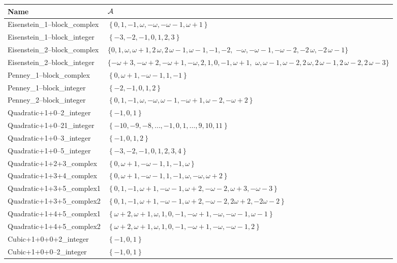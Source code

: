 \begin{tabular}{lp{}}  Name & $\mathcal{A}$\\ \hline
Eisenstein\_1--block\_complex &
$ \left\{0, 1, -1, \omega, -\omega, -\omega - 1, \omega + 1\right\}  $ \\
Eisenstein\_1--block\_integer &
$ \left\{-3, -2, -1, 0, 1, 2, 3\right\}  $ \\
Eisenstein\_2--block\_complex &
$ \{0, 1, \omega, \omega + 1, 2 \, \omega, 2 \, \omega - 1, \omega - 1, -1, -2,$ \newline $-\omega, -\omega - 1, -\omega - 2, -2 \, \omega, -2 \, \omega - 1 \}  $ \\
Eisenstein\_2--block\_integer &
$ \{-\omega + 3, -\omega + 2, -\omega + 1, -\omega, 2, 1, 0, -1, \omega + 1,$ \newline $ \omega, \omega - 1, \omega - 2, 2 \, \omega, 2 \, \omega - 1, 2 \, \omega - 2, 2 \, \omega - 3\}  $ \\
Penney\_1--block\_complex &
$ \left\{0, \omega + 1, -\omega - 1, 1, -1\right\}  $ \\
Penney\_1--block\_integer &
$ \left\{-2, -1, 0, 1, 2\right\}  $ \\
Penney\_2--block\_integer &
$ \left\{0, 1, -1, \omega, -\omega, \omega - 1, -\omega + 1, \omega - 2, -\omega + 2\right\}  $ \\
Quadratic+1+0--2\_integer &
$ \left\{-1, 0, 1\right\}  $ \\
Quadratic+1+0--21\_integer &
$ \left\{-10, -9, -8, \dots, -1, 0, 1, \dots, 9, 10, 11\right\}  $ \\
Quadratic+1+0--3\_integer &
$ \left\{-1,0, 1,  2\right\}  $ \\
Quadratic+1+0--5\_integer &
$ \left\{-3, -2, -1, 0, 1, 2, 3, 4\right\}  $ \\
Quadratic+1+2+3\_complex &
$ \left\{0, \omega + 1, -\omega - 1, 1, -1, \omega\right\}  $ \\
Quadratic+1+3+4\_complex &
$ \left\{0, \omega + 1, -\omega - 1, 1, -1, \omega, -\omega, \omega + 2\right\}  $ \\
Quadratic+1+3+5\_complex1 &
$ \left\{0, 1, -1, \omega + 1, -\omega - 1, \omega + 2, -\omega - 2, \omega + 3, -\omega - 3\right\}  $ \\
Quadratic+1+3+5\_complex2  &
$ \left\{0, 1, -1, \omega + 1, -\omega - 1, \omega + 2, -\omega - 2, 2 \omega + 2, -2 \omega - 2\right\}  $ \\
Quadratic+1+4+5\_complex1 &
$ \left\{\omega + 2, \omega + 1, \omega, 1, 0, -1, -\omega + 1, -\omega, -\omega - 1, \omega - 1\right\}  $ \\
Quadratic+1+4+5\_complex2 &
$ \left\{\omega + 2, \omega + 1, \omega, 1, 0, -1, -\omega + 1, -\omega, -\omega - 1, 2\right\}  $ \\
Cubic+1+0+0+2\_integer &
$ \left\{-1, 0, 1\right\}  $ \\
Cubic+1+0+0--2\_integer &
$ \left\{-1, 0, 1\right\}  $ \\
\end{tabular}

